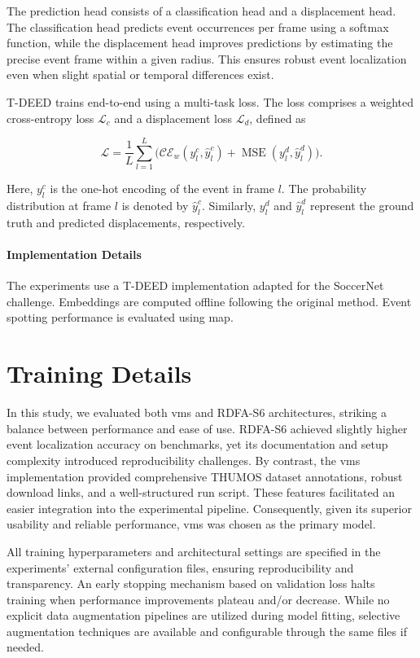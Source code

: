 The prediction head consists of a classification head and a displacement head. The classification head predicts event occurrences per frame using a softmax function, while the displacement head improves predictions by estimating the precise event frame within a given radius. This ensures robust event localization even when slight spatial or temporal differences exist.


T-DEED trains end-to-end using a multi-task loss. The loss comprises a weighted cross-entropy loss \(\mathcal{L}_c\) and a displacement loss \(\mathcal{L}_d\), defined as

\[
\mathcal{L} = \frac{1}{L}\sum_{l=1}^{L}\Big(\mathcal{CE}_{w}(y_l^{c},\hat{y}_l^c) + \operatorname{MSE}(y_l^{d},\hat{y}_l^d)\Big).
\]

Here, \(y_l^{c}\) is the one-hot encoding of the event in frame \(l\). The probability distribution at frame \(l\) is denoted by \(\hat{y}_l^c\). Similarly, \(y_l^{d}\) and \(\hat{y}_l^d\) represent the ground truth and predicted displacements, respectively.

\paragraph{Implementation Details} The experiments use a T-DEED implementation adapted for the SoccerNet challenge. Embeddings are computed offline following the original method. Event spotting performance is evaluated using \acrlong{map}.


\section{Training Details} 

In this study, we evaluated both \acrshort{vms} and RDFA-S6 architectures, striking a balance between performance and ease of use. RDFA-S6 achieved slightly higher event localization accuracy on benchmarks, yet its documentation and setup complexity introduced reproducibility challenges. By contrast, the \acrshort{vms} implementation provided comprehensive THUMOS dataset annotations, robust download links, and a well-structured run script. These features facilitated an easier integration into the experimental pipeline. Consequently, given its superior usability and reliable performance, \acrshort{vms} was chosen as the primary model.

All training hyperparameters and architectural settings are specified in the experiments' external configuration files, ensuring reproducibility and transparency. An early stopping mechanism based on validation loss halts training when performance improvements plateau and/or decrease. While no explicit data augmentation pipelines are utilized during model fitting, selective augmentation techniques are available and configurable through the same files if needed.

